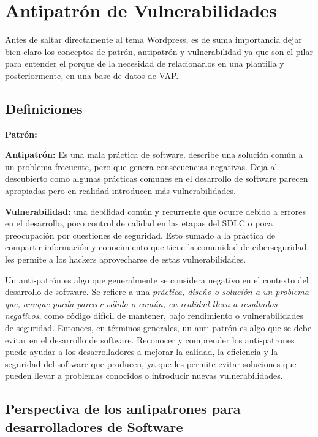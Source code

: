 
\chapter{Antipatrón de Vulnerabilidades}    

Antes de saltar directamente al tema Wordpress, es de suma importancia dejar bien claro los conceptos de patrón, antipatrón y vulnerabilidad ya que son el pilar para entender el porque de la necesidad de relacionarlos en una plantilla y posteriormente, en una base de datos de VAP.

\section{Definiciones}

\textbf{Patrón:}

\textbf{Antipatrón:} Es una mala práctica de software.  describe una solución común a un problema frecuente, pero que genera consecuencias negativas. Deja al descubierto como algunas prácticas comunes en el desarrollo de software parecen apropiadas pero en realidad introducen más vulnerabilidades. 

\textbf{Vulnerabilidad:} una debilidad común y recurrente que ocurre debido a errores en el desarrollo, poco control de calidad en las etapas del SDLC o poca preocupación por cuestiones de seguridad. Esto sumado a la práctica de compartir información y conocimiento  que tiene la comunidad de ciberseguridad, les permite a los hackers aprovecharse de estas vulnerabilidades.

\vspace{0.3cm}
Un anti-patrón es algo que generalmente se considera negativo en el contexto del desarrollo de software. Se refiere a una \textit{práctica, diseño o solución a un problema que, aunque pueda parecer válido o común, en realidad lleva a resultados negativos}, como código difícil de mantener, bajo rendimiento o vulnerabilidades de seguridad.
Entonces, en términos generales, un anti-patrón es algo que se debe evitar en el desarrollo de software. Reconocer y comprender los anti-patrones puede ayudar a los desarrolladores a mejorar la calidad, la eficiencia y la seguridad del software que producen, ya que les permite evitar soluciones que pueden llevar a problemas conocidos o introducir nuevas vulnerabilidades.

\section{Perspectiva de los antipatrones para desarrolladores de Software}

